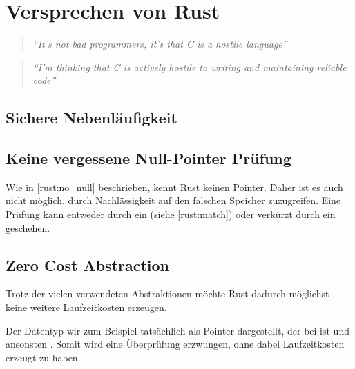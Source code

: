 \section{Versprechen von Rust}
\label{rust:guarantees}


\begin{quotation}
	\textit{\enquote{It’s not bad programmers, it’s that C is a hostile language}} 
	\cite[54]{rust:c_is_hostile_mena}
\end{quotation}

\begin{quotation}
	\textit{\enquote{I’m thinking that C is actively hostile to writing and maintaining reliable code}} 
	\cite[129]{rust:c_is_hostile_mena}
\end{quotation}



\subsection{Sichere Nebenläufigkeit}


\subsection{Keine vergessene Null-Pointer Prüfung}
\label{rust:no_null_detail}

Wie in \autoref{rust:no_null} beschrieben, kennt Rust keinen  Pointer.
Daher ist es auch nicht möglich, durch Nachlässigkeit auf den falschen Speicher zuzugreifen.
Eine Prüfung kann entweder durch ein  (siehe \autoref{rust:match}) oder verkürzt durch ein  geschehen.

\subsection{Zero Cost Abstraction}
\label{rust:zero_cost}

Trotz der vielen verwendeten Abstraktionen möchte Rust dadurch möglichst keine weitere Laufzeitkosten erzeugen.

Der  Datentyp wir zum Beispiel tatsächlich als Pointer dargestellt, der bei   ist und ansonsten  \cite[100]{rust:orly_programming}.
Somit wird eine Überprüfung erzwungen, ohne dabei Laufzeitkosten erzeugt zu haben.

